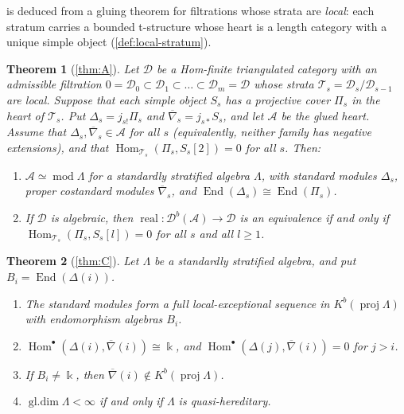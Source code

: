 \documentclass[11pt,reqno]{amsart}
\theoremstyle{plain}
\newtheorem{maintheorem}{Theorem}
\theoremstyle{definition}
\theoremstyle{remark}
\newcommand{\kk}{\Bbbk}
\DeclareMathOperator{\Hom}{Hom}
\DeclareMathOperator{\End}{End}
\DeclareMathOperator{\real}{real}
\DeclareMathOperator{\gldim}{gl.dim}
\newcommand{\modd}{\operatorname{mod}}
\newcommand{\proj}{\operatorname{proj}}
\newcommand{\Db}{\mathcal{D}^b}
\newcommand{\Kb}{K^b}
\newcommand{\nablabar}{\overline{\nabla}}
\newcommand{\cD}{\mathcal{D}}
\newcommand{\cA}{\mathcal{A}}
\newcommand{\cT}{\mathcal{T}}
\begin{document}
 is deduced from a gluing theorem for filtrations whose strata are \emph{local}: each stratum carries a bounded t-structure whose heart is a length category with a unique simple object (\cref{def:local-stratum}).

\begin{maintheorem}[\cref{thm:A}]\label{mthm:A}
Let $\cD$ be a Hom-finite triangulated category with an admissible filtration $0=\cD_0\subset\cD_1\subset\dots\subset\cD_m=\cD$ whose strata $\cT_s=\cD_s/\cD_{s-1}$ are local. Suppose that each simple object $S_s$ has a projective cover $\Pi_s$ in the heart of $\cT_s$. Put $\Delta_s=j_{s!}\Pi_s$ and $\nablabar_s=j_{s*}S_s$, and let $\cA$ be the glued heart. Assume that $\Delta_s,\nablabar_s\in\cA$ for all $s$ (equivalently, neither family has negative extensions), and that $\Hom_{\cT_s}(\Pi_s,S_s[2])=0$ for all $s$. Then:
\begin{enumerate}
\item $\cA\simeq\modd\Lambda$ for a standardly stratified algebra $\Lambda$, with standard modules $\Delta_s$, proper costandard modules $\nablabar_s$, and $\End(\Delta_s)\cong\End(\Pi_s)$.
\item If $\cD$ is algebraic, then $\real\colon\Db(\cA)\to\cD$ is an equivalence if and only if $\Hom_{\cT_s}(\Pi_s,S_s[l])=0$ for all $s$ and all $l\ge1$.
\end{enumerate}
\end{maintheorem}

\begin{maintheorem}[\cref{thm:C}]\label{mthm:C}
Let $\Lambda$ be a standardly stratified algebra, and put $B_i=\End(\Delta(i))$.
\begin{enumerate}
\item The standard modules form a full local-exceptional sequence in $\Kb(\proj\Lambda)$ with endomorphism algebras $B_i$.
\item $\Hom^\bullet(\Delta(i),\nablabar(i))\cong\kk$, and $\Hom^\bullet(\Delta(j),\nablabar(i))=0$ for $j>i$.
\item If $B_i\neq\kk$, then $\nablabar(i)\notin\Kb(\proj\Lambda)$.
\item $\gldim\Lambda<\infty$ if and only if $\Lambda$ is quasi-hereditary.
\end{enumerate}
\end{maintheorem}
\end{document}
